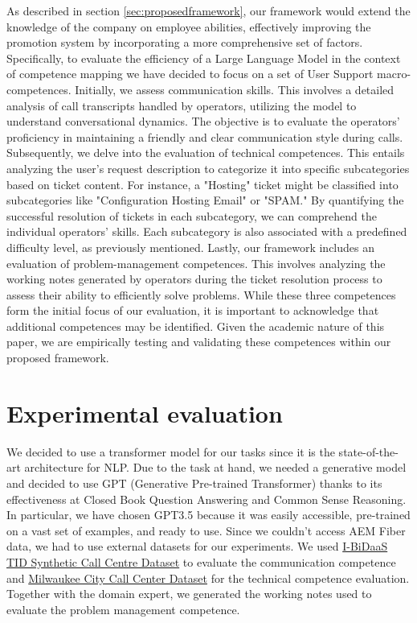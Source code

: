 As described in section \ref{sec:proposedframework}, our framework would extend the knowledge of the company on employee abilities, effectively improving the promotion system by incorporating a more comprehensive set of factors. Specifically, to evaluate the efficiency of a Large Language Model in the context of competence mapping we have decided to focus on a set of User Support macro-competences. Initially, we assess communication skills. This involves a detailed analysis of call transcripts handled by operators, utilizing the model to understand conversational dynamics. The objective is to evaluate the operators' proficiency in maintaining a friendly and clear communication style during calls. Subsequently, we delve into the evaluation of technical competences. This entails analyzing the user's request description to categorize it into specific subcategories based on ticket content. For instance, a "Hosting" ticket might be classified into subcategories like "Configuration Hosting Email" or "SPAM." By quantifying the successful resolution of tickets in each subcategory, we can comprehend the individual operators' skills. Each subcategory is also associated with a predefined difficulty level, as previously mentioned. Lastly, our framework includes an evaluation of problem-management competences. This involves analyzing the working notes generated by operators during the ticket resolution process to assess their ability to efficiently solve problems. While these three competences form the initial focus of our evaluation, it is important to acknowledge that additional competences may be identified. Given the academic nature of this paper, we are empirically testing and validating these competences within our proposed framework.

\section{Experimental evaluation}

We decided to use a transformer model for our tasks since it is the state-of-the-art architecture for NLP.
Due to the task at hand, we needed a generative model and decided to use GPT (Generative Pre-trained Transformer) thanks to its effectiveness at Closed Book Question Answering and Common Sense Reasoning.
In particular, we have chosen GPT3.5 because it was easily accessible, pre-trained on a vast set of examples, and ready to use. Since we couldn't access AEM Fiber data, we had to use external datasets for our experiments. We used \href{https://zenodo.org/records/4274454}{I-BiDaaS TID Synthetic Call Centre Dataset} to evaluate the communication competence and \href{https://data.milwaukee.gov/dataset/callcenterdatahistorical/resource/abdfe983-e856-40cd-bee2-85e78454344a}{Milwaukee City Call Center Dataset} for the technical competence evaluation. Together with the domain expert, we generated the working notes used to evaluate the problem management competence.

